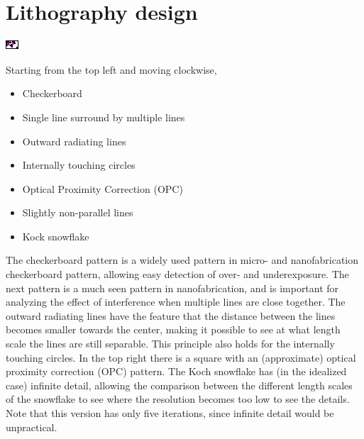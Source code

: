 \section{Lithography design}
\begin{Figure}
    \centering
    \includegraphics[trim=0mm 0.12mm 0.17mm 0mm, clip=true,width=\linewidth]{figures/litho_design.pdf}
    \label{fig:distancea10}
\end{Figure} 

Starting from the top left and moving clockwise,

\begin{itemize}
\item Checkerboard
\item Single line surround by multiple lines
\item Outward radiating lines
\item Internally touching circles
\item Optical Proximity Correction (OPC)
\item Slightly non-parallel lines
\item Kock snowflake
\end{itemize}

The checkerboard pattern is a widely used pattern in micro- and nanofabrication checkerboard pattern, allowing easy detection of over- and underexposure. The next pattern is a much seen pattern in nanofabrication, and is important for analyzing the effect of interference when multiple lines are close together. The outward radiating lines have the feature that the distance between the lines becomes smaller towards the center, making it possible to see at what length scale the lines are still separable. This principle also holds for the internally touching circles. In the top right there is a square with an (approximate) optical proximity correction (OPC) pattern. The Koch snowflake has (in the idealized case) infinite detail, allowing the comparison between the different length scales of the snowflake to see where the resolution becomes too low to see the details. Note that this version has only five iterations, since infinite detail would be unpractical.

